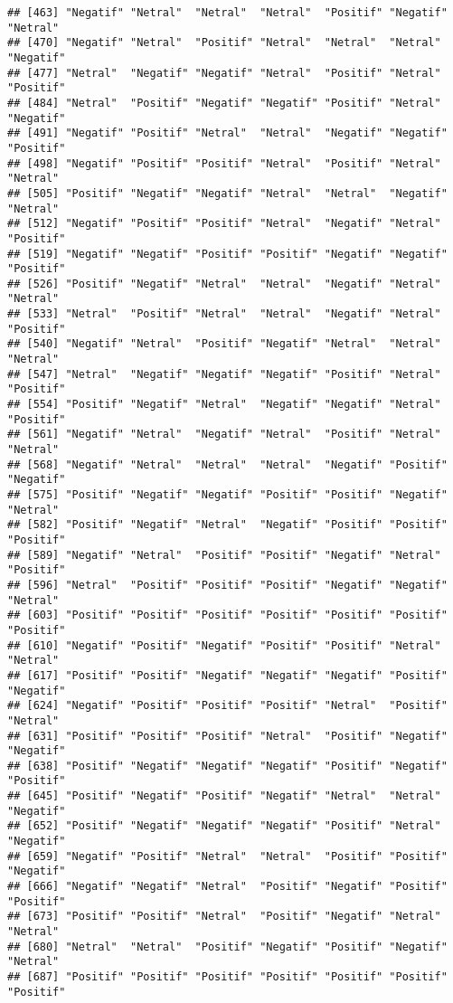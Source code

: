 \documentclass[
]{article}
\begin{document}
\begin{verbatim}
## [463] "Negatif" "Netral"  "Netral"  "Netral"  "Positif" "Negatif" "Netral" 
## [470] "Negatif" "Netral"  "Positif" "Netral"  "Netral"  "Netral"  "Negatif"
## [477] "Netral"  "Negatif" "Negatif" "Netral"  "Positif" "Netral"  "Positif"
## [484] "Netral"  "Positif" "Negatif" "Negatif" "Positif" "Netral"  "Negatif"
## [491] "Negatif" "Positif" "Netral"  "Netral"  "Negatif" "Negatif" "Positif"
## [498] "Negatif" "Positif" "Positif" "Netral"  "Positif" "Netral"  "Netral" 
## [505] "Positif" "Negatif" "Negatif" "Netral"  "Netral"  "Negatif" "Netral" 
## [512] "Negatif" "Positif" "Positif" "Netral"  "Negatif" "Netral"  "Positif"
## [519] "Negatif" "Negatif" "Positif" "Positif" "Negatif" "Negatif" "Positif"
## [526] "Positif" "Negatif" "Netral"  "Netral"  "Negatif" "Netral"  "Netral" 
## [533] "Netral"  "Positif" "Netral"  "Netral"  "Negatif" "Netral"  "Positif"
## [540] "Negatif" "Netral"  "Positif" "Negatif" "Netral"  "Netral"  "Netral" 
## [547] "Netral"  "Negatif" "Negatif" "Negatif" "Positif" "Netral"  "Positif"
## [554] "Positif" "Negatif" "Netral"  "Negatif" "Negatif" "Netral"  "Positif"
## [561] "Negatif" "Netral"  "Negatif" "Netral"  "Positif" "Netral"  "Netral" 
## [568] "Negatif" "Netral"  "Netral"  "Netral"  "Negatif" "Positif" "Negatif"
## [575] "Positif" "Negatif" "Negatif" "Positif" "Positif" "Negatif" "Netral" 
## [582] "Positif" "Negatif" "Netral"  "Negatif" "Positif" "Positif" "Positif"
## [589] "Negatif" "Netral"  "Positif" "Positif" "Negatif" "Netral"  "Positif"
## [596] "Netral"  "Positif" "Positif" "Positif" "Negatif" "Negatif" "Netral" 
## [603] "Positif" "Positif" "Positif" "Positif" "Positif" "Positif" "Positif"
## [610] "Negatif" "Positif" "Negatif" "Positif" "Positif" "Netral"  "Netral" 
## [617] "Positif" "Positif" "Negatif" "Negatif" "Negatif" "Positif" "Negatif"
## [624] "Negatif" "Positif" "Positif" "Positif" "Netral"  "Positif" "Netral" 
## [631] "Positif" "Positif" "Positif" "Netral"  "Positif" "Negatif" "Negatif"
## [638] "Positif" "Negatif" "Negatif" "Negatif" "Positif" "Negatif" "Positif"
## [645] "Positif" "Negatif" "Positif" "Negatif" "Netral"  "Netral"  "Negatif"
## [652] "Positif" "Negatif" "Negatif" "Negatif" "Positif" "Netral"  "Negatif"
## [659] "Negatif" "Positif" "Netral"  "Netral"  "Positif" "Positif" "Negatif"
## [666] "Negatif" "Negatif" "Netral"  "Positif" "Negatif" "Positif" "Positif"
## [673] "Positif" "Positif" "Netral"  "Positif" "Negatif" "Netral"  "Netral" 
## [680] "Netral"  "Netral"  "Positif" "Negatif" "Positif" "Negatif" "Netral" 
## [687] "Positif" "Positif" "Positif" "Positif" "Positif" "Positif" "Positif"

\end{verbatim}
\end{document}
